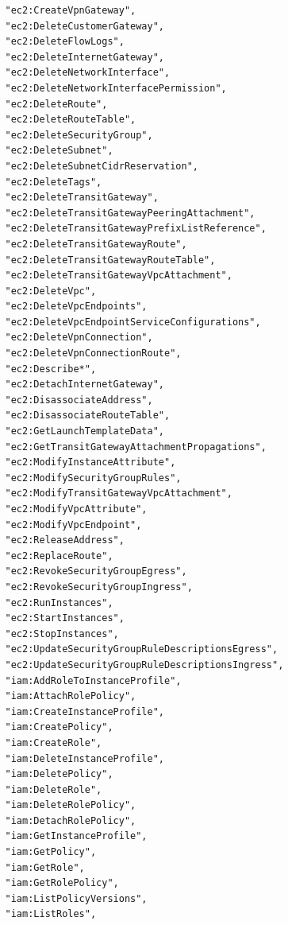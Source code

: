 \begin{verbatim}
                "ec2:CreateVpnGateway",
                "ec2:DeleteCustomerGateway",
                "ec2:DeleteFlowLogs",
                "ec2:DeleteInternetGateway",
                "ec2:DeleteNetworkInterface",
                "ec2:DeleteNetworkInterfacePermission",
                "ec2:DeleteRoute",
                "ec2:DeleteRouteTable",
                "ec2:DeleteSecurityGroup",
                "ec2:DeleteSubnet",
                "ec2:DeleteSubnetCidrReservation",
                "ec2:DeleteTags",
                "ec2:DeleteTransitGateway",
                "ec2:DeleteTransitGatewayPeeringAttachment",
                "ec2:DeleteTransitGatewayPrefixListReference",
                "ec2:DeleteTransitGatewayRoute",
                "ec2:DeleteTransitGatewayRouteTable",
                "ec2:DeleteTransitGatewayVpcAttachment",
                "ec2:DeleteVpc",
                "ec2:DeleteVpcEndpoints",
                "ec2:DeleteVpcEndpointServiceConfigurations",
                "ec2:DeleteVpnConnection",
                "ec2:DeleteVpnConnectionRoute",
                "ec2:Describe*",
                "ec2:DetachInternetGateway",
                "ec2:DisassociateAddress",
                "ec2:DisassociateRouteTable",
                "ec2:GetLaunchTemplateData",
                "ec2:GetTransitGatewayAttachmentPropagations",
                "ec2:ModifyInstanceAttribute",
                "ec2:ModifySecurityGroupRules",
                "ec2:ModifyTransitGatewayVpcAttachment",
                "ec2:ModifyVpcAttribute",
                "ec2:ModifyVpcEndpoint",
                "ec2:ReleaseAddress",
                "ec2:ReplaceRoute",
                "ec2:RevokeSecurityGroupEgress",
                "ec2:RevokeSecurityGroupIngress",
                "ec2:RunInstances",
                "ec2:StartInstances",
                "ec2:StopInstances",
                "ec2:UpdateSecurityGroupRuleDescriptionsEgress",
                "ec2:UpdateSecurityGroupRuleDescriptionsIngress",
                "iam:AddRoleToInstanceProfile",
                "iam:AttachRolePolicy",
                "iam:CreateInstanceProfile",
                "iam:CreatePolicy",
                "iam:CreateRole",
                "iam:DeleteInstanceProfile",
                "iam:DeletePolicy",
                "iam:DeleteRole",
                "iam:DeleteRolePolicy",
                "iam:DetachRolePolicy",
                "iam:GetInstanceProfile",
                "iam:GetPolicy",
                "iam:GetRole",
                "iam:GetRolePolicy",
                "iam:ListPolicyVersions",
                "iam:ListRoles",

\end{verbatim}
